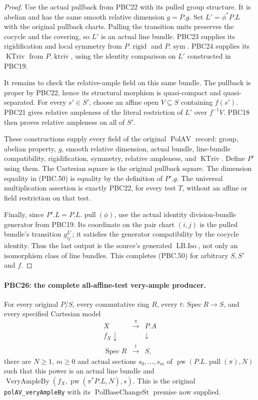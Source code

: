 \begin{proof}
Use the actual pullback from PBC22 with its pulled group
structure.  It is abelian and has the same smooth relative
dimension $g=P.g$.  Set $L'=\phi^*P.L$ with the original
pullback charts.  Pulling the transition units preserves
the cocycle and the covering, so $L'$ is an actual line bundle.
PBC23 supplies its rigidification and local symmetry from
$P.\operatorname{rigid}$ and $P.\operatorname{sym}$.
PBC24 supplies its $\operatorname{KTriv}$ from
$P.\operatorname{ktriv}$, using the identity comparison
on $L'$ constructed in PBC19.

It remains to check the relative-ample field on this same
bundle.  The pullback is proper by PBC22, hence its
structural morphism is quasi-compact and quasi-separated.
For every $s'\in S'$, choose an affine open $V\subseteq S$
containing $f(s')$.  PBC21 gives relative ampleness of the
literal restriction of $L'$ over $f^{-1}V$.
PBC18 then proves relative ampleness on all of $S'$.

These constructions supply every field of the original
$\operatorname{PolAV}$ record: group, abelian property,
$g$, smooth relative dimension, actual bundle, line-bundle
compatibility, rigidification, symmetry, relative ampleness,
and $\operatorname{KTriv}$.  Define $P'$ using them.
The Cartesian square is the original pullback square.
The dimension equality in (PBC.50) is equality by the
definition of $P'.g$.  The universal multiplication assertion
is exactly PBC22, for every test $T$, without an affine or
field restriction on that test.

Finally, since $P'.L=P.L.\operatorname{pull}(\phi)$,
use the actual identity division-bundle generator from
PBC19.  Its coordinate on the pair chart $(i,j)$ is the
pulled bundle's transition $g^{L'}_{ij}$; it satisfies
the generator compatibility by the cocycle identity.
Thus the last output is the source's generated
$\operatorname{LB.Iso}$, not only an isomorphism class
of line bundles.  This completes (PBC.50) for arbitrary
$S,S'$ and $f$.
\end{proof}

\paragraph{PBC26: the complete all-affine-test very-ample producer.}
\label{claim:PBC26}
For every original $P/S$, every commutative ring $R$, every
$t:\operatorname{Spec}R\to S$, and every specified Cartesian
model
\[
 \begin{array}{ccc}
 X&\xrightarrow{\pi}&P.A\\
 f_X\downarrow&&\downarrow\\
 \operatorname{Spec}R&\xrightarrow{t}&S,
 \end{array}
\]
there are $N\ge1$, $m\ge0$ and actual sections
$s_0,\ldots,s_m$ of
$\operatorname{pw}(P.L.\operatorname{pull}(\pi),N)$
such that this power is an actual line bundle and
$\operatorname{VeryAmpleBy}(f_X,\operatorname{pw}(\pi^*P.L,N),s)$.
This is the original \texttt{polAV\_veryAmpleBy} with its
$\operatorname{PolBaseChangeSt}$ premise now supplied.

